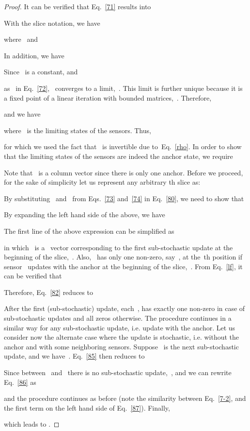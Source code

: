 \documentclass[draftclsnofoot, onecolumn, 12pt]{IEEEtran}
\begin{document}
\begin{proof}
It can be verified that Eq.~\eqref{71} results into

With the slice notation, we have

where~ and

In addition, we have

Since~ is a constant, and

as~ in Eq.~\eqref{72},~ converges to a limit,~. This limit is further unique because it is a fixed point of a linear iteration with bounded matrices,~\cite{tsit_book}. Therefore,

and we have

where~ is the limiting states of the sensors. Thus,

for which we used the fact that~ is invertible due to~Eq.~\eqref{rho}. In order to show that the limiting states of the sensors are indeed the anchor state, we require

Note that~ is a column vector since there is only one anchor. Before we proceed, for the sake of simplicity let us represent any arbitrary th slice as:

By substituting~ and~ from Eqs.~\eqref{73} and~\eqref{74} in Eq.~\eqref{80}, we need to show that

By expanding the left hand side of the above, we have

The first line of the above expression can be simplified as

in which~ is a~ vector corresponding to the first sub-stochastic update at the beginning of the slice,~. Also,~ has only one non-zero, say~, at the~th position if sensor~ updates with the anchor at the beginning of the slice,~. From Eq.~\eqref{lf}, it can be verified that

Therefore, Eq.~\eqref{82} reduces to

After the first (sub-stochastic) update, each~, has exactly one non-zero in case of sub-stochastic updates and all zeros otherwise. The procedure continues in a similar way for any sub-stochastic update, i.e. update with the anchor. Let us consider now the alternate case where the update is stochastic, i.e. without the anchor and with some neighboring sensors. Suppose~ is the next sub-stochastic update, and we have~. Eq.~\eqref{85} then reduces to

Since between~ and~ there is no sub-stochastic update,~, and we can rewrite Eq.~\eqref{86} as

and the procedure continues as before (note the similarity between Eq.~\eqref{7-2}, and the first term on the left hand side of Eq.~\eqref{87}). Finally, 

which leads to .
\end{proof}
\end{document}
